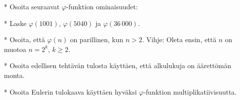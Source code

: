 \begin{kotitehtavasivu}
\begin{tehtava}
    *  Osoita seuraavat $\varphi$-funktion ominaisuudet:
\end{tehtava}

\begin{tehtava}
    * Laske $\varphi(1001)$, $\varphi(5040)$ ja $\varphi(36\,000)$.
\end{tehtava}

\begin{tehtava}
    * Osoita, että $\varphi(n)$ on parillinen, kun $n>2$. Vihje: Oleta ensin, että $n$ on muotoa $n=2^k$, $k\ge 2$.
\end{tehtava}

\begin{tehtava}
    * Osoita edellisen tehtävän tulosta käyttäen, että alkulukuja on äärettömän monta.
\end{tehtava}

\begin{tehtava}
    * Osoita Eulerin tulokaava käyttäen hyväksi  $\varphi$-funktion multiplikatiivisuutta.
\end{tehtava}

\end{kotitehtavasivu}
